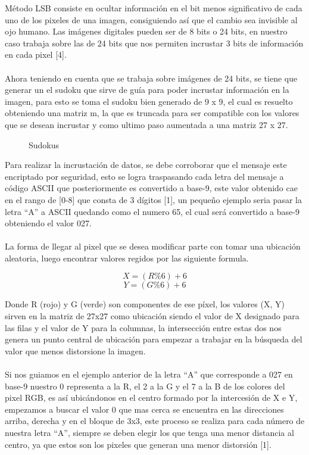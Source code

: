 \documentclass[14pt]{article}
\begin{document}
Método LSB consiste en ocultar información en el bit menos significativo de cada uno de los pixeles de una imagen, consiguiendo así que el cambio sea invisible al ojo humano. Las imágenes digitales pueden ser de 8 bits o 24 bits, en nuestro caso trabaja sobre las de 24 bits que nos permiten incrustar 3 bits de información en cada pixel [4]. 
		\\~\\	
Ahora teniendo en cuenta que se trabaja sobre imágenes de 24 bits, se tiene que generar un el sudoku que sirve de guía para poder incrustar información en la imagen, para esto se toma el sudoku bien generado de 9 x 9, el cual es resuelto obteniendo una matriz m, la que es truncada para ser compatible con los valores que se desean incrustar y como ultimo paso aumentada a una matriz 27 x 27.
	

	\begin{figure}[htbp]
		\centering
		\caption{Sudokus}\label{figura:Legos}	
	\end{figure}

Para realizar la incrustación de datos, se debe corroborar que el mensaje este encriptado por seguridad, esto se logra traspasando cada letra del mensaje a código ASCII que posteriormente es convertido a base-9, este valor obtenido cae en el rango de [0-8] que consta de 3 dígitos [1], un pequeño ejemplo seria pasar la letra “A” a ASCII quedando como el numero 65, el cual será convertido a base-9 obteniendo el valor 027.
		\\~\\
La forma de llegar al pixel que se desea modificar parte con tomar una ubicación aleatoria, luego encontrar valores regidos por las siguiente formula.

\[X = (R\%6) + 6 \]
\[Y = (G\%6) + 6 \]

Donde R (rojo) y G (verde)  son componentes de ese píxel, los valores (X, Y) sirven en la matriz de 27x27 como ubicación siendo el valor de X designado para las filas y el valor de Y para la columnas, la intersección entre estas dos nos genera un punto central de ubicación para empezar a trabajar en la búsqueda del valor que menos distorsione la imagen. 
		\\~\\
Si nos guiamos en el ejemplo anterior de la letra “A” que corresponde a 027 en base-9 nuestro 0 representa a la R, el 2 a la G y el 7 a la B de los colores del pixel RGB, es así ubicándonos en el centro formado por la intercesión de X e Y, empezamos a buscar el valor 0 que mas cerca se encuentra en las direcciones arriba, derecha y en el bloque de 3x3, este proceso se realiza para cada número de nuestra letra “A”, siempre se deben elegir los que tenga una menor distancia al centro, ya que estos son los pixeles que generan una menor distorsión [1].
\end{document}

